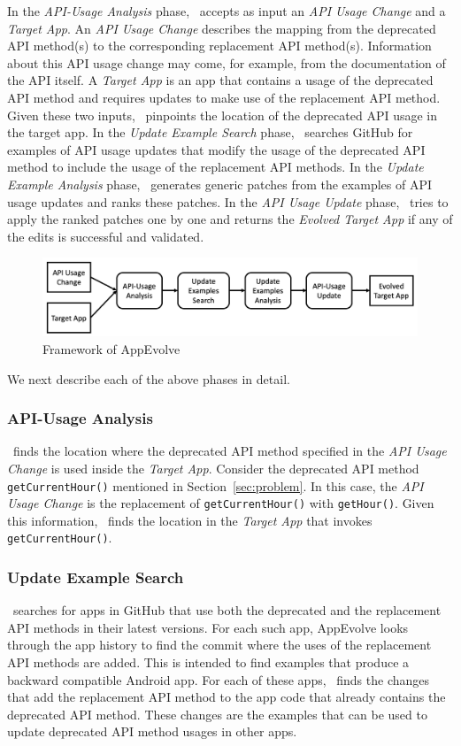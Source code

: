 In the {\em API-Usage Analysis} phase, \toolname\ accepts as input an {\em
  API Usage Change} and a {\em Target App}. An {\em API Usage Change}
describes the mapping from the deprecated API method(s) to the
corresponding replacement API method(s).  Information about this API usage
change may come, for example, from the documentation of the API itself. A
{\em Target App} is an app that contains a usage of the deprecated API
method and requires updates to make use of the replacement API
method. Given these two inputs, \toolname\ pinpoints the location of the
deprecated API usage in the target app. In the {\em Update Example
  Search} phase, \toolname\ searches GitHub for examples of API usage
updates that modify the usage of the deprecated API method to include the
usage of the replacement API methods. In the {\em Update Example Analysis}
phase, \toolname\ generates generic patches from the examples of API usage
updates and ranks these patches. In the {\em API Usage Update} phase,
\toolname\ tries to apply the ranked patches one by one and returns the
                 {\em Evolved Target App} if any of the edits is successful
                 and validated.

\begin{figure}[t]
	\centering
	\includegraphics[width=0.8\linewidth]{framework.png}
	\caption{Framework of AppEvolve}
	\label{fig:framework}
\end{figure}

We next describe each of the above phases in detail.
\subsubsection{API-Usage Analysis}
\toolname\ finds the location where the deprecated API method specified in
the {\em API Usage Change} is used inside the {\em Target App}. Consider
the deprecated API method \texttt{getCurrentHour()} mentioned in
Section~\ref{sec:problem}.  In this case, the {\em API Usage Change} is the
replacement of \texttt{getCurrentHour()} with \texttt{getHour()}. Given
this information, \toolname\ finds the location in the {\em Target App}
that invokes \texttt{getCurrentHour()}.

\subsubsection{Update Example Search}
\toolname\ searches for apps in GitHub that use both the deprecated and the
replacement API methods in their latest versions.  For each such app,
AppEvolve looks through the app history to find the commit where the uses
of the replacement API methods are added. This is intended to find examples
that produce a backward compatible Android app.  For each of these apps,
\toolname\ finds the changes that add the replacement API method to the app
code that already contains the deprecated API method. These changes are the
examples that can be used to update deprecated API method usages in other
apps.

